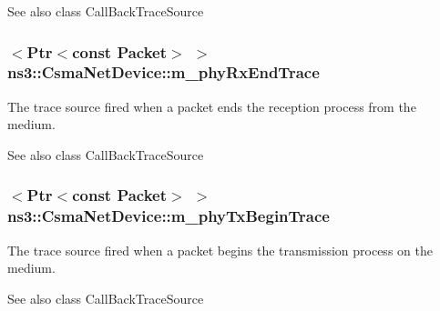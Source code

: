 \begin{DoxySeeAlso}{See also}
class Call\+Back\+Trace\+Source 
\end{DoxySeeAlso}
\subsubsection[{\texorpdfstring{m\+\_\+phy\+Rx\+End\+Trace}{m_phyRxEndTrace}}]{$<${\bf Ptr}$<$const {\bf Packet}$>$ $>$ ns3\+::\+Csma\+Net\+Device\+::m\+\_\+phy\+Rx\+End\+Trace\hspace{0.3cm}{\ttfamily [private]}}\hypertarget{classns3_1_1CsmaNetDevice_afe2bac4b10c5d73f78e11668a3e6a679}{}\label{classns3_1_1CsmaNetDevice_afe2bac4b10c5d73f78e11668a3e6a679}
The trace source fired when a packet ends the reception process from the medium.

\begin{DoxySeeAlso}{See also}
class Call\+Back\+Trace\+Source 
\end{DoxySeeAlso}
\subsubsection[{\texorpdfstring{m\+\_\+phy\+Tx\+Begin\+Trace}{m_phyTxBeginTrace}}]{$<${\bf Ptr}$<$const {\bf Packet}$>$ $>$ ns3\+::\+Csma\+Net\+Device\+::m\+\_\+phy\+Tx\+Begin\+Trace\hspace{0.3cm}{\ttfamily [private]}}\hypertarget{classns3_1_1CsmaNetDevice_a6c5deac5e6a05a2013175402d4e22985}{}\label{classns3_1_1CsmaNetDevice_a6c5deac5e6a05a2013175402d4e22985}
The trace source fired when a packet begins the transmission process on the medium.

\begin{DoxySeeAlso}{See also}
class Call\+Back\+Trace\+Source 
\end{DoxySeeAlso}
